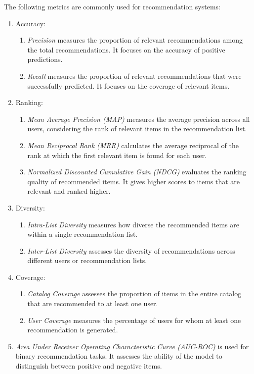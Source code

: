 		The following metrics are commonly used for recommendation systems:

		\begin{enumerate}
			\item Accuracy:
				\begin{enumerate}
					\item \textit{Precision} measures the proportion of relevant recommendations among the total recommendations. It focuses on the accuracy of positive predictions.
					\item \textit{Recall} measures the proportion of relevant recommendations that were successfully predicted. It focuses on the coverage of relevant items.
				\end{enumerate}
			\item Ranking:
				\begin{enumerate}
					\item \textit{Mean Average Precision (MAP)} measures the average precision across all users, considering the rank of relevant items in the recommendation list.
					\item \textit{Mean Reciprocal Rank (MRR)} calculates the average reciprocal of the rank at which the first relevant item is found for each user.
					\item \textit{Normalized Discounted Cumulative Gain (NDCG)} evaluates the ranking quality of recommended items. It gives higher scores to items that are relevant and ranked higher.
				\end{enumerate}
			\item Diversity:
				\begin{enumerate}
					\item \textit{Intra-List Diversity} measures how diverse the recommended items are within a single recommendation list.
					\item \textit{Inter-List Diversity} assesses the diversity of recommendations across different users or recommendation lists.
				\end{enumerate}
			\item Coverage:
				\begin{enumerate}
					\item \textit{Catalog Coverage} assesses the proportion of items in the entire catalog that are recommended to at least one user.
					\item \textit{User Coverage} measures the percentage of users for whom at least one recommendation is generated.
				\end{enumerate}
			\item \textit{Area Under Receiver Operating Characteristic Curve (AUC-ROC)} is used for binary recommendation tasks. It assesses the ability of the model to distinguish between positive and negative items.

\end{enumerate}
